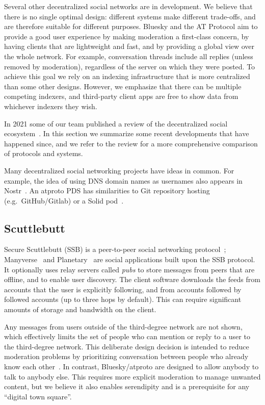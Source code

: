 \documentclass[sigconf]{acmart}
\begin{document}
Several other decentralized social networks are in development.
We believe that there is no single optimal design: different systems make different trade-offs, and are therefore suitable for different purposes.
Bluesky and the AT Protocol aim to provide a good user experience by making moderation a first-class concern, by having clients that are lightweight and fast, and by providing a global view over the whole network.
For example, conversation threads include all replies (unless removed by moderation), regardless of the server on which they were posted.
To achieve this goal we rely on an indexing infrastructure that is more centralized than some other designs.
However, we emphasize that there can be multiple competing indexers, and third-party client apps are free to show data from whichever indexers they wish.

In 2021 some of our team published a review of the decentralized social ecosystem~\cite{EcosystemReview}.
In this section we summarize some recent developments that have happened since, and we refer to the review for a more comprehensive comparison of protocols and systems.

Many decentralized social networking projects have ideas in common.
For example, the idea of using DNS domain names as usernames also appears in Nostr~\cite{NostrDNS}.
An atproto PDS has similarities to Git repository hosting (e.g.\ GitHub/Gitlab) or a Solid pod~\cite{Solid}.

\subsection{Scuttlebutt}

Secure Scuttlebutt (SSB) is a peer-to-peer social networking protocol~\cite{Scuttlebutt}; Manyverse~\cite{Manyverse} and Planetary~\cite{Planetary} are social applications built upon the SSB protocol.
It optionally uses relay servers called \emph{pubs} to store messages from peers that are offline, and to enable user discovery.
The client software downloads the feeds from accounts that the user is explicitly following, and from accounts followed by followed accounts (up to three hops by default).
This can require significant amounts of storage and bandwidth on the client.

Any messages from users outside of the third-degree network are not shown, which effectively limits the set of people who can mention or reply to a user to the third-degree network.
This deliberate design decision is intended to reduce moderation problems by prioritizing conversation between people who already know each other~\cite{ManyverseBluesky}.
In contrast, Bluesky/atproto are designed to allow anybody to talk to anybody else.
This requires more explicit moderation to manage unwanted content, but we believe it also enables serendipity and is a prerequisite for any ``digital town square''.
\end{document}
